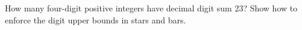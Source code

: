 How many four-digit positive integers have decimal digit sum 23? Show how to enforce the digit upper bounds in stars and bars.
